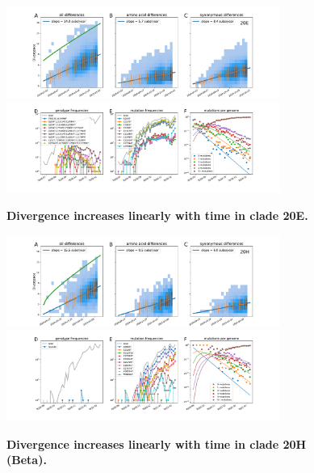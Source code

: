 \begin{figure}[h]
    \includegraphics[width=0.8\textwidth]{figures/rtt/20E_rtt.pdf}
    \includegraphics[width=0.8\textwidth]{figures/counts/20E_counts.pdf}
    \caption{{\bf Divergence increases linearly with time in clade 20E.}
    \label{fig:20E_divergence}}
\end{figure}

\begin{figure}[h]
    \includegraphics[width=0.8\textwidth]{figures/rtt/20H_rtt.pdf}
    \includegraphics[width=0.8\textwidth]{figures/counts/20H_counts.pdf}
    \caption{{\bf Divergence increases linearly with time in clade 20H (Beta).}
    \label{fig:20H_divergence}}
\end{figure}

